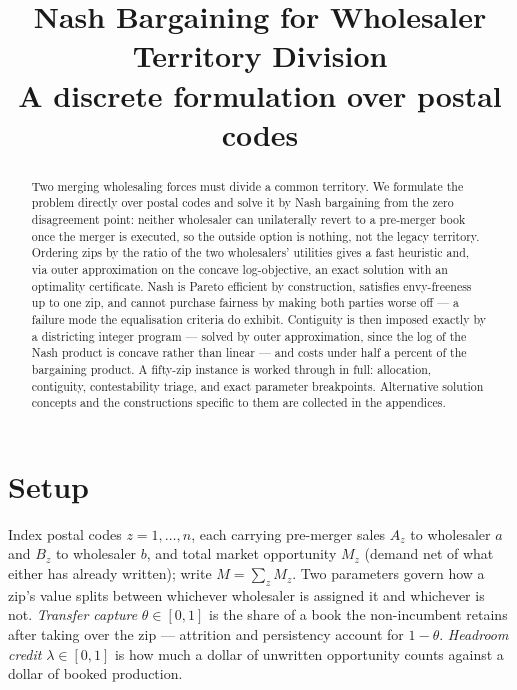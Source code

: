 \documentclass[11pt]{article}
\title{\bfseries Nash Bargaining for Wholesaler Territory Division\\[2pt]
\large A discrete formulation over postal codes}
\author{}\date{}
\theoremstyle{remark}\newtheorem*{remark}{Remark}
\begin{document}
\maketitle\vspace{-2.2em}

\begin{abstract}
\noindent Two merging wholesaling forces must divide a common territory. We formulate
the problem directly over postal codes and solve it by Nash bargaining from the zero
disagreement point: neither wholesaler can unilaterally revert to a pre-merger book once
the merger is executed, so the outside option is nothing, not the legacy territory.
Ordering zips by the ratio of the two wholesalers' utilities
gives a fast heuristic and, via outer approximation on the concave log-objective, an
exact solution with an optimality certificate. Nash is Pareto efficient
by construction, satisfies envy-freeness up to one zip, and cannot purchase fairness by
making both parties worse off --- a failure mode the equalisation criteria do exhibit.
Contiguity is then imposed exactly by a districting integer program --- solved by outer
approximation, since the log of the Nash product is concave rather than linear --- and
costs under half a percent of the bargaining product. A fifty-zip instance is worked through in full: allocation,
contiguity, contestability triage, and exact parameter breakpoints. Alternative
solution concepts and the constructions specific to them are collected in the
appendices.
\end{abstract}

\section{Setup}\label{sec:setup}
Index postal codes $z=1,\dots,n$, each carrying pre-merger sales $A_z$ to wholesaler $a$
and $B_z$ to wholesaler $b$, and total market opportunity $M_z$ (demand net of what
either has already written); write $M=\sum_zM_z$. Two parameters govern how a zip's
value splits between whichever wholesaler is assigned it and whichever is not.
\emph{Transfer capture} $\theta\in[0,1]$ is the share of a book the non-incumbent retains
after taking over the zip --- attrition and persistency account for $1-\theta$.
\emph{Headroom credit} $\lambda\in[0,1]$ is how much a dollar of unwritten opportunity
counts against a dollar of booked production.
\end{document}
